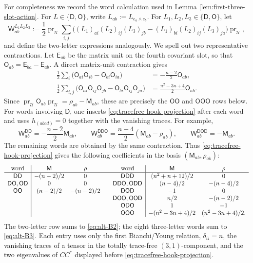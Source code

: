 \documentclass[reqno,11pt]{amsart}
\theoremstyle{definition}
\newcommand{\cU}{\mathcal U}
\begin{document}
For completeness we record the word calculation used in
Lemma \ref{lem:first-three-slot-action}. For $L\in\{\mathsf D,\mathsf O\}$, write
$L_{ab}:=L_{e_a\wedge e_b}$. For
$L_1,L_2,L_3\in\{\mathsf D,\mathsf O\}$, let
$$
 \mathsf W^{L_1L_2L_3}_{ab}
 :=\frac12\operatorname{pr}_{\cU}\sum_{i,j}
 \bigl((L_1)_{ai}(L_2)_{ij}(L_3)_{jb}
      -(L_1)_{bi}(L_2)_{ij}(L_3)_{ja}\bigr)
 \operatorname{pr}_{\cU},
$$
and define the two-letter expressions analogously. We spell out two
representative contractions. Let $\mathsf E_{ab}$ be the matrix unit on the
fourth covariant slot, so that
$\mathsf O_{ab}=\mathsf E_{ba}-\mathsf E_{ab}$. A direct matrix-unit
contraction gives
\begin{align*}
 \frac12\sum_i
 \bigl(\mathsf O_{ai}\mathsf O_{ib}
      -\mathsf O_{bi}\mathsf O_{ia}\bigr)
 &=-\frac{n-2}{2}\mathsf O_{ab},\\
 \frac12\sum_{i,j}
 \bigl(\mathsf O_{ai}\mathsf O_{ij}\mathsf O_{jb}
      -\mathsf O_{bi}\mathsf O_{ij}\mathsf O_{ja}\bigr)
 &=\frac{n^2-3n+4}{2}\mathsf O_{ab}.
\end{align*}
Since
$\operatorname{pr}_{\cU}\mathsf O_{ab}\operatorname{pr}_{\cU}
=\rho_{ab}-\mathsf M_{ab}$, these are precisely the
$\mathsf{OO}$ and $\mathsf{OOO}$ rows below. For words involving
$\mathsf D$, one inserts \eqref{eq:tracefree-hook-projection} after each word and
uses $h_{(abcd)}=0$ together with the vanishing traces. For example,
$$
 \mathsf W^{\mathsf{DD}}_{ab}=-\frac{n-2}{2}\mathsf M_{ab},
 \qquad
 \mathsf W^{\mathsf{DDO}}_{ab}
 =\frac{n-4}{2}(\mathsf M_{ab}-\rho_{ab}),
 \qquad
 \mathsf W^{\mathsf{DOD}}_{ab}=-\mathsf M_{ab}.
$$
The remaining words are obtained by the same contraction. Thus
\eqref{eq:tracefree-hook-projection} gives the following coefficients in the
basis $(\mathsf M_{ab},\rho_{ab})$:
$$
\begin{array}{c|cc@{\qquad}c|cc}
\text{word}&\mathsf M&\rho&\text{word}&\mathsf M&\rho\\ \hline
\mathsf{DD}&-(n-2)/2&0&\mathsf{DDD}&(n^2+n+12)/2&0\\
\mathsf{DO},\mathsf{OD}&0&0&\mathsf{DDO},\mathsf{ODD}&(n-4)/2&-(n-4)/2\\
\mathsf{OO}&(n-2)/2&-(n-2)/2&\mathsf{DOD}&-1&0\\
&&&\mathsf{DOO},\mathsf{OOD}&n/2&-(n-2)/2\\
&&&\mathsf{ODO}&1&-1\\
&&&\mathsf{OOO}&-(n^2-3n+4)/2&(n^2-3n+4)/2.
\end{array}
$$
The two-letter row sums to \eqref{eq:alt-B2}; the eight three-letter words
sum to \eqref{eq:alt-B3}. Each entry uses only the first Bianchi/Young
relation, $\delta_{ii}=n$, the vanishing traces of a tensor in the totally trace-free $(3,1)$-component, and the two
eigenvalues of $CC^*$ displayed before
\eqref{eq:tracefree-hook-projection}.
\end{document}
